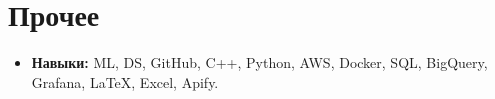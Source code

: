 \documentclass[letterpaper,11pt]{article}
\makeatletter
\newcommand{\resumeItem}[1]{
  \item\small{
    {#1 \vspace{-2pt}}
  }
}
\newcommand{\resumeProjectHeading}[2]{
    \item
    \begin{tabular*}{0.97\textwidth}{l@{\extracolsep{\fill}}r}
      \small#1 & #2 \\
    \end{tabular*}\vspace{-7pt}
}
\newcommand{\resumeSubHeadingListStart}{\begin{itemize}[leftmargin=0.15in, label={}]}
\newcommand{\resumeSubHeadingListEnd}{\end{itemize}}
\newcommand{\resumeItemListStart}{\begin{itemize}}
\newcommand{\resumeItemListEnd}{\end{itemize}\vspace{-5pt}}
\makeatother
\begin{document}

\section{Прочее}
\resumeSubHeadingListStart
  \resumeItem{\textbf{Навыки:} ML, DS, GitHub, C++, Python, AWS, Docker, SQL, BigQuery, Grafana, LaTeX, Excel, Apify.}
\resumeSubHeadingListEnd
\end{document}
